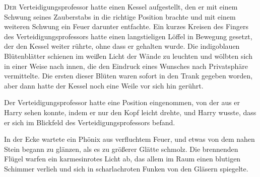 
\lettrine{D}{er} Verteidigungsprofessor hatte einen Kessel aufgestellt, den er mit einem Schwung seines Zauberstabs in die richtige Position brachte und mit einem weiteren Schwung ein Feuer darunter entfachte. Ein kurzes Kreisen des Fingers des Verteidigungsprofessors hatte einen langstieligen Löffel in Bewegung gesetzt, der den Kessel weiter rührte, ohne dass er gehalten wurde. Die indigoblauen Blütenblätter schienen im weißen Licht der Wände zu leuchten und wölbten sich in einer Weise nach innen, die den Eindruck eines Wunsches nach Privatsphäre vermittelte. Die ersten dieser Blüten waren sofort in den Trank gegeben worden, aber dann hatte der Kessel noch eine Weile vor sich hin gerührt.

Der Verteidigungsprofessor hatte eine Position eingenommen, von der aus er Harry sehen konnte, indem er nur den Kopf leicht drehte, und Harry wusste, dass er sich im Blickfeld des Verteidigungsprofessors befand.

In der Ecke wartete ein Phönix aus verfluchtem Feuer, und etwas von dem nahen Stein begann zu glänzen, als es zu größerer Glätte schmolz. Die brennenden Flügel warfen ein karmesinrotes Licht ab, das allem im Raum einen blutigen Schimmer verlieh und sich in scharlachroten Funken von den Gläsern spiegelte.

